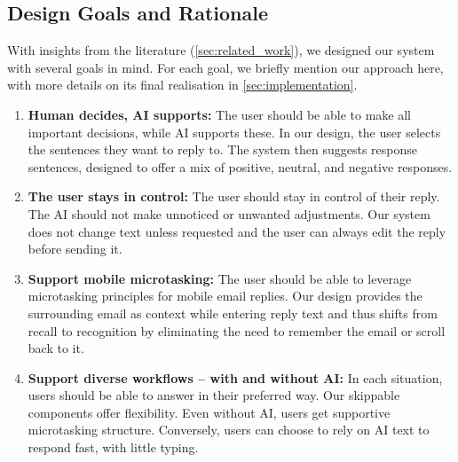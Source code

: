 \subsection{Design Goals and Rationale} 
With insights from the literature (\cref{sec:related_work}), we designed our system with several goals in mind. For each goal, we briefly mention our approach here, with more details on its final realisation in \cref{sec:implementation}.
\begin{enumerate}[leftmargin=*]
    \item \textbf{Human decides, AI supports:}
    \label{dg:humandecides}
    The user should be able to make all important decisions, while AI supports these. 
    In our design, the user selects the sentences they want to reply to. 
    The system then suggests response sentences, designed to offer a mix of positive, neutral, and negative responses. 
    \item \textbf{The user stays in control:}
    \label{dg:control}
    The user should stay in control of their reply. 
    The AI should not make unnoticed or unwanted adjustments. 
    Our system does not change text unless requested and the user can always edit the reply before sending it.
    \item \textbf{Support mobile microtasking:}
    \label{dg:microtasking}
    The user should be able to leverage microtasking principles for mobile email replies. %
    Our design provides the surrounding email as context while entering reply text and thus shifts from recall to recognition by eliminating the need to remember the email or scroll back to it.%
    \item \textbf{Support diverse workflows -- with and without AI:}
    \label{dg:workflows}
    In each situation, users should be able to answer in their preferred way.
    Our skippable components offer flexibility.
    Even without AI, users get supportive microtasking structure.
    Conversely, users can choose to rely on AI text to respond fast, with little typing. %
\end{enumerate}





